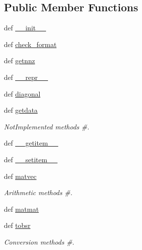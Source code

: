 \subsection*{Public Member Functions}
\begin{DoxyCompactItemize}
\item 
def \hyperlink{classscipy_1_1sparse_1_1bsr_1_1bsr__matrix_a8cd2e3eed919e98d12ffa1717626da72}{\+\_\+\+\_\+init\+\_\+\+\_\+}
\item 
def \hyperlink{classscipy_1_1sparse_1_1bsr_1_1bsr__matrix_a2ddfc31291c9226bb90725a1052917ba}{check\+\_\+format}
\item 
def \hyperlink{classscipy_1_1sparse_1_1bsr_1_1bsr__matrix_a9ba0aebea1da2d711704b42e9a7d64d2}{getnnz}
\item 
def \hyperlink{classscipy_1_1sparse_1_1bsr_1_1bsr__matrix_a50a5149c2fd756ab6a4501ff499d3a0e}{\+\_\+\+\_\+repr\+\_\+\+\_\+}
\item 
def \hyperlink{classscipy_1_1sparse_1_1bsr_1_1bsr__matrix_a9f632c76cad19984089b00694c6a47bf}{diagonal}
\item 
def \hyperlink{classscipy_1_1sparse_1_1bsr_1_1bsr__matrix_a63b211fe7b965379468aaeb7a4d89747}{getdata}
\begin{DoxyCompactList}\small\item\em Not\+Implemented methods \#. \end{DoxyCompactList}\item 
def \hyperlink{classscipy_1_1sparse_1_1bsr_1_1bsr__matrix_a064987cc88ac07ca45b61514622f4b24}{\+\_\+\+\_\+getitem\+\_\+\+\_\+}
\item 
def \hyperlink{classscipy_1_1sparse_1_1bsr_1_1bsr__matrix_a749781c4306657914171b2b480007e22}{\+\_\+\+\_\+setitem\+\_\+\+\_\+}
\item 
def \hyperlink{classscipy_1_1sparse_1_1bsr_1_1bsr__matrix_ae9d486bad16dbd7000301be5c19f4e94}{matvec}
\begin{DoxyCompactList}\small\item\em Arithmetic methods \#. \end{DoxyCompactList}\item 
def \hyperlink{classscipy_1_1sparse_1_1bsr_1_1bsr__matrix_a3b1b75a10a1756f710f0a5c50ef6d6b0}{matmat}
\item 
def \hyperlink{classscipy_1_1sparse_1_1bsr_1_1bsr__matrix_a06d8d6a4421eb95d7373f765dfa8b9fc}{tobsr}
\begin{DoxyCompactList}\small\item\em Conversion methods \#. \end{DoxyCompactList}\item 

\end{DoxyCompactItemize}
